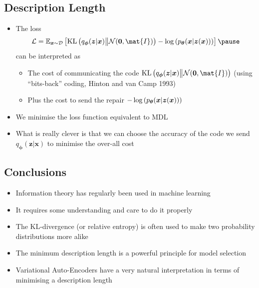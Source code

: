 \begin{slide}
\section[-1]{Description Length}

\begin{PauseHighLight}
  \begin{itemize}
  \item The loss
    \begin{align*}
      \mathcal{L} =
      \av[\bm{x}\sim\mathcal{D}]{
      \KL{q_{\bm{\phi}}(\bm{z}|\bm{x})}{\mathcal{N}(\bm{0},\mat{I})}
      - \logg{p_{\bm{\theta}}(\bm{x}|\bm{z}(\bm{x}))}}\pause
    \end{align*}
    can be interpreted as
    \begin{itemize}
    \item The cost of communicating the code
      $\KL{q_{\bm{\phi}}(\bm{z}|\bm{x})}{\mathcal{N}(\bm{0},\mat{I})}$\pause{}
      {\small (using ``bits-back'' coding, Hinton and van Camp 1993)}\pauseb
    \item Plus the cost to send the repair $-\log\left( p_{\bm{\theta}}(\bm{x}|\bm{z}(\bm{x})) \right)$\pause
    \end{itemize}
  \item We minimise the loss function\pause{} equivalent to MDL\pauseb
  \item What is really clever is that we can choose the accuracy of
    the code we send $q_{\bm{\phi}}(\bm{z}|\bm{x})$ to minimise the
    over-all cost\pause
  \end{itemize}
\end{PauseHighLight}

\end{slide}



\begin{slide}
\section{Conclusions}

\begin{PauseHighLight}
  \begin{itemize}
  \item Information theory has regularly been used in machine
    learning\pause
  \item It requires some understanding and care to do it
    properly\pause
  \item The KL-divergence (or relative entropy) is often used to make
    two probability distributions more alike\pause
  \item The minimum description length is a powerful principle for
    model selection\pause
  \item Variational Auto-Encoders have a very natural interpretation
    in terms of minimising a description length\pause
  \end{itemize}
\end{PauseHighLight}


\end{slide}





